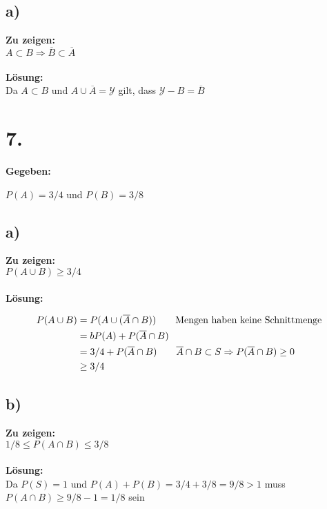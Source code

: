 \documentclass{article}
\begin{document}
\subsection*{a)}

\textbf{Zu zeigen: } \\

$A \subset B \Rightarrow \overline{B} \subset \overline{A}$ \\ \\
\textbf{Lösung:} \\

Da $A \subset B$ und $A \cup \overline{A} = \mathcal{Y}$  gilt, dass $\mathcal{Y} - B = \overline{B} $


\section*{7.}
\textbf{Gegeben:}

$P(A) = 3/4$ und $P(B) = 3/8$

\subsection*{a)}


\textbf{Zu zeigen:} \\

$P(A \cup B) \geq 3/4$ \\ \\
\textbf{Lösung:}  

\begin{align*}
    P(A \cup B) &= P(A \cup (\overline{A} \cap B)) \tag*{Mengen haben keine Schnittmenge}\\
    &=b P(A) + P(\overline{A} \cap B) \\
    &= 3/4 + P(\overline{A} \cap B) \tag*{$ \overline{A}\cap B  \subset S \Rightarrow P(\overline{A}\cap B) \geq 0$} \\
    &\geq 3/4
\end{align*}


\subsection*{b)}


\textbf{Zu zeigen:} \\

$1/8 \leq P(A\cap B) \leq 3/8$ \\ \\
\textbf{Lösung:}  \\

Da $P(S) =1$ und $P(A) + P(B) = 3/4 + 3/8 = 9/8 > 1$ muss $P(A\cap B) \geq 9/8 - 1 = 1/8$ sein \\
\end{document}
